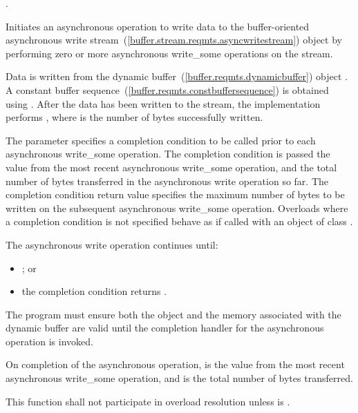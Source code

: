 \begin{itemdescr}
\pnum
\completionsig {}.

\pnum
\effects Initiates an asynchronous operation to write data to the buffer-oriented asynchronous write stream~(\ref{buffer.stream.reqmts.asyncwritestream}) object  by performing zero or more asynchronous write_some operations on the stream.

\pnum
Data is written from the dynamic buffer~(\ref{buffer.reqmts.dynamicbuffer}) object . A constant buffer sequence~(\ref{buffer.reqmts.constbuffersequence}) is obtained using . After the data has been written to the stream, the implementation performs , where  is the number of bytes successfully written.

\pnum
The  parameter specifies a completion condition to be called prior to each asynchronous write_some operation. The completion condition is passed the  value from the most recent asynchronous write_some operation, and the total number of bytes transferred in the asynchronous write operation so far. The completion condition return value specifies the maximum number of bytes to be written on the subsequent asynchronous write_some operation. Overloads where a completion condition is not specified behave as if called with an object of class .

\pnum
The asynchronous write operation continues until:

\begin{itemize}
\item {}; or
\item the completion condition returns .
\end{itemize}

\pnum
The program must ensure both the  object  and the memory associated with the dynamic buffer  are valid until the completion handler for the asynchronous operation is invoked.

\pnum
On completion of the asynchronous operation,  is the  value from the most recent asynchronous write_some operation, and  is the total number of bytes transferred.

\pnum
\remarks This function shall not participate in overload resolution unless  is .
\end{itemdescr}



